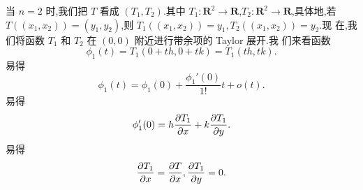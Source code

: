 \message{ !name(连续可微可逆映射对单位正方形的作用.tex)}\documentclass[a4paper, 12pt]{article} %
\begin{document}
当 $n=2$ 时,我们把 $T$ 看成 $(T_1,T_2)$.其中 $T_1:\mathbf{R}^2\to
\mathbf{R}$,$T_2:\mathbf{R}^2\to \mathbf{R}$,具体地,若
$T((x_1,x_2))=(y_1,y_2)$,则 $T_1((x_1,x_2))=y_1,T_2((x_1,x_2))=y_2$.现
在,我们将函数 $T_1$ 和 $T_2$ 在 $(0,0)$ 附近进行带余项的 Taylor 展开.我
们来看函数
$$
\phi_1(t)=T_1(0+th,0+tk)=T_1(th,tk).
$$
易得
$$
\phi_1(t)=\phi_{1}(0)+\frac{\phi_1'(0)}{1!}t+o(t).
$$
易得
$$
\phi_1'(0)=h\frac{\partial T_1}{\partial x}+k \frac{\partial T_1}{\partial y}.
$$
易得
$$
\frac{\partial T_1}{\partial x}=\frac{\partial T}{\partial x},\frac{\partial T_1}{\partial y}=0.
$$


  

  

  
\end{document}
